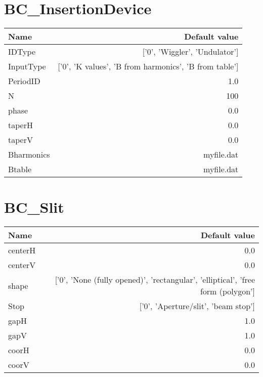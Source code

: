 \documentclass{article}
\begin{document}
\section{BC\_InsertionDevice}
\begin{tabular}{lr}
Name & Default value \\
\hline
IDType & ['0', 'Wiggler', 'Undulator'] \\
InputType & ['0', 'K values', 'B from harmonics', 'B from table'] \\
PeriodID & 1.0 \\
N & 100 \\
phase & 0.0 \\
taperH & 0.0 \\
taperV & 0.0 \\
Bharmonics & myfile.dat \\
Btable & myfile.dat \\
   
\end{tabular}



\section{BC\_Slit}
\begin{tabular}{lr}
Name & Default value \\
\hline
centerH & 0.0 \\
centerV & 0.0 \\
shape & ['0', 'None (fully opened)', 'rectangular', 'elliptical', 'free form (polygon'] \\
Stop & ['0', 'Aperture/slit', 'beam stop'] \\
gapH & 1.0 \\
gapV & 1.0 \\
coorH & 0.0 \\
coorV & 0.0 \\
   
\end{tabular}



\end{document}
